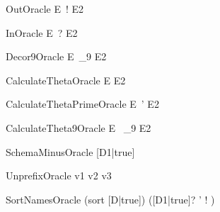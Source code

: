 \documentclass{article}
\newcommand{\unprefix}{\mathrel{unprefix}}
\begin{document}
\begin{zedproviso}{OutOracle}
  E~! \is E2
\end{zedproviso}

\begin{zedproviso}{InOracle}
  E~? \is E2
\end{zedproviso}

\begin{zedproviso}{Decor9Oracle}
  E~_9 \is E2
\end{zedproviso}

\begin{zedproviso}{CalculateThetaOracle}
  \theta E \is E2
\end{zedproviso}

\begin{zedproviso}{CalculateThetaPrimeOracle}
  \theta E~' \is E2
\end{zedproviso}

\begin{zedproviso}{CalculateTheta9Oracle}
  \theta E~ _9 \is E2
\end{zedproviso}

\begin{zedproviso}{SchemaMinusOracle}
  [D1|true] \schemaminus [D2|true] \is [D3|true]
\end{zedproviso}

\begin{zedproviso}{UnprefixOracle}
  v1 \unprefix v2 \is v3
\end{zedproviso}

\begin{zedproviso}{SortNamesOracle}
  (sort [D|true]) \is ([D1|true]? \land [D2|true]' \land
                       [D3|true]! \land [D4|true])
\end{zedproviso}
\end{document}
